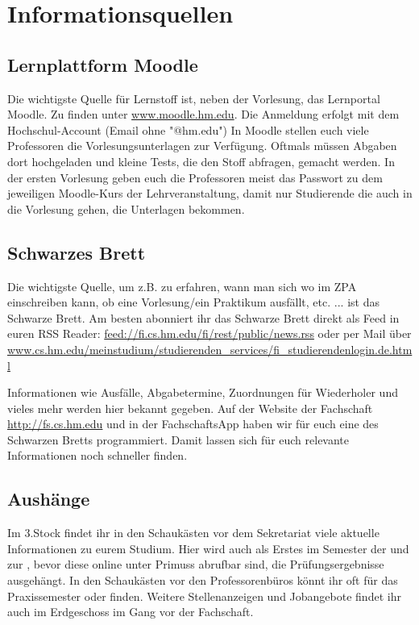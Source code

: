 \section{Informationsquellen}

\subsection{Lernplattform Moodle}
Die wichtigste Quelle für Lernstoff ist, neben der Vorlesung, das Lernportal Moodle. Zu finden unter \url{www.moodle.hm.edu}.
Die Anmeldung erfolgt mit dem Hochschul-Account (Email ohne "@hm.edu")\doublebreak
In Moodle stellen euch viele Professoren die Vorlesungsunterlagen zur Verfügung. Oftmals müssen Abgaben dort hochgeladen und kleine Tests, die den Stoff abfragen, gemacht werden.
In der ersten Vorlesung geben euch die Professoren meist das Passwort zu dem jeweiligen Moodle-Kurs der Lehrveranstaltung, damit nur Studierende die auch in die Vorlesung gehen, die Unterlagen bekommen.

\subsection{Schwarzes Brett}
Die wichtigste Quelle, um z.B. zu erfahren, wann man sich wo im ZPA einschreiben kann, ob eine Vorlesung/ein Praktikum ausfällt, etc. ... ist das Schwarze Brett.\doublebreak 
Am besten abonniert ihr das Schwarze Brett direkt als Feed in euren RSS Reader: \url{feed://fi.cs.hm.edu/fi/rest/public/news.rss} oder per Mail über \url{www.cs.hm.edu/meinstudium/studierenden\_services/fi\_studierendenlogin.de.html} 

Informationen wie Ausfälle, Abgabetermine, Zuordnungen für Wiederholer und vieles mehr werden hier bekannt gegeben.
Auf der Website der Fachschaft \url{http://fs.cs.hm.edu} und in der FachschaftsApp haben wir für euch eine  des Schwarzen Bretts
programmiert. Damit lassen sich für euch relevante Informationen noch schneller finden.

\subsection{Aushänge}
Im 3.Stock findet ihr in den Schaukästen vor dem Sekretariat viele 
aktuelle Informationen zu eurem Studium. Hier wird auch als Erstes im 
Semester der  und zur , bevor diese 
online unter Primuss abrufbar sind, die Prüfungsergebnisse ausgehängt. In den
Schaukästen vor den Professorenbüros könnt ihr oft  
für das Praxissemester oder  finden. 
Weitere Stellenanzeigen und Jobangebote findet ihr auch im 
Erdgeschoss im Gang vor der Fachschaft. 

